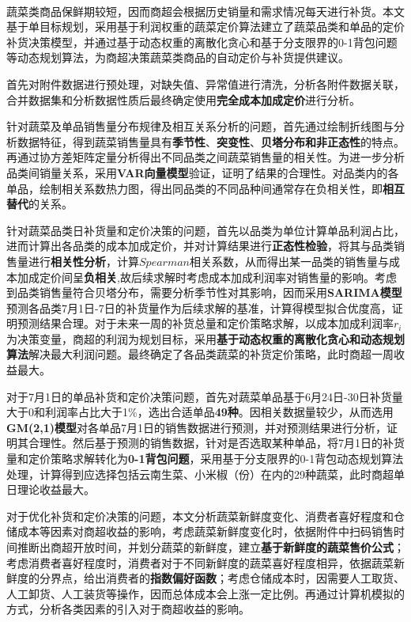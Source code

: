 \documentclass{my_paper}
\begin{document}
\newpage
\begin{center}
\lunwenbiaoti \\
\vspace{2ex}
\zhaiyao
\end{center}

蔬菜类商品保鲜期较短，因而商超会根据历史销量和需求情况每天进行补货。本文基于单目标规划，采用基于利润权重的蔬菜定价算法建立了蔬菜品类和单品的定价补货决策模型，并通过基于动态权重的离散化贪心和基于分支限界的0-1背包问题等动态规划算法，为商超决策蔬菜类商品的自动定价与补货提供建议。\par
首先对附件数据进行预处理，对缺失值、异常值进行清洗，分析各附件数据关联，合并数据集和分析数据性质后最终确定使用\textbf{完全成本加成定价}进行分析。\par 
针对蔬菜及单品销售量分布规律及相互关系分析的问题，首先通过绘制折线图与分析数据特征，得到蔬菜销售量具有\textbf{季节性}、\textbf{突变性}、\textbf{贝塔分布和非正态性}的特点。再通过协方差矩阵定量分析得出不同品类之间蔬菜销售量的相关性。为进一步分析品类间销量关系，采用\textbf{VAR向量模型}验证，证明了结果的合理性。对品类内的各单品，绘制相关系数热力图，得出同品类的不同品种间通常存在负相关性，即\textbf{相互替代}的关系。\par
针对蔬菜品类日补货量和定价决策的问题，首先以品类为单位计算单品利润占比，进而计算出各品类的成本加成定价，并对计算结果进行\textbf{正态性检验}，将其与品类销售量进行\textbf{相关性分析}，计算$Spearman$相关系数，从而得出某一品类的销售量与成本加成定价间呈\textbf{负相关},故后续求解时考虑成本加成利润率对销售量的影响。考虑到品类销售量符合贝塔分布，需要分析季节性对其影响，因而采用\textbf{SARIMA模型}预测各品类7月1日-7日的补货量作为后续求解的基准，计算得模型拟合优度高，证明预测结果合理。对于未来一周的补货总量和定价策略求解，以成本加成利润率$r_i$为决策变量，商超的利润为规划目标，采用\textbf{基于动态权重的离散化贪心和动态规划算法}解决最大利润问题。最终确定了各品类蔬菜的补货定价策略，此时商超一周收益最大。\par
对于7月1日的单品补货和定价决策问题，首先对蔬菜单品基于6月24日-30日补货量大于0和利润率占比大于1\%，选出合适单品\textbf{49种}。因相关数据量较少，从而选用\textbf{GM(2,1)模型}对各单品7月1日的销售数据进行预测，并对预测结果进行分析，证明其合理性。然后基于预测的销售数据，针对是否选取某种单品，将7月1日的补货量和定价策略求解转化为\textbf{0-1背包问题}，采用基于分支限界的0-1背包动态规划算法处理，计算得到应选择包括云南生菜、小米椒（份）在内的29种蔬菜，此时商超单日理论收益最大。\par
对于优化补货和定价决策的问题，本文分析蔬菜新鲜度变化、消费者喜好程度和仓储成本等因素对商超收益的影响，考虑蔬菜新鲜度变化时，依据附件中扫码销售时间推断出商超开放时间，并划分蔬菜的新鲜度，建立\textbf{基于新鲜度的蔬菜售价公式}；考虑消费者喜好程度时，消费者对于不同新鲜度的蔬菜喜好程度相异，依据蔬菜新鲜度的分界点，给出消费者的\textbf{指数偏好函数}；考虑仓储成本时，因需要人工取货、人工卸货、人工装货等操作，因而总体成本会上涨一定比例。再通过计算机模拟的方式，分析各类因素的引入对于商超收益的影响。
\end{document}
